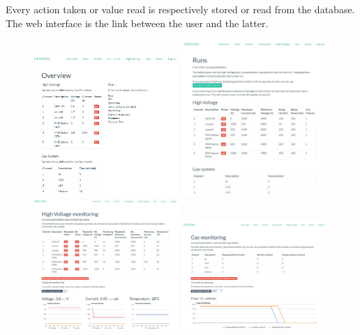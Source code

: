       Every action taken or value read is respectively stored or read from the database. The web interface is the link between the user and the latter.

      \begin{figure}[h!]
        \centering
        \includegraphics[width=0.49\textwidth]{img/III-1-arch/app-home.png}
        \includegraphics[width=0.49\textwidth]{img/III-1-arch/app-runs.png} \\
        \includegraphics[width=0.49\textwidth]{img/III-1-arch/app-hv.png}
        \includegraphics[width=0.49\textwidth]{img/III-1-arch/app-gas.png}
        \caption{}
        \label{fig:III-1-app}
      \end{figure}

